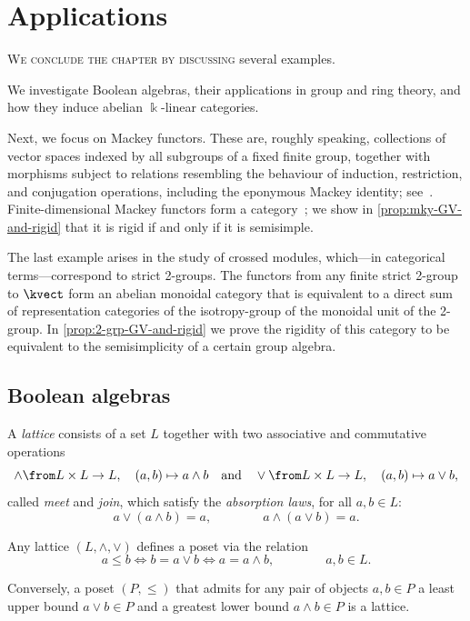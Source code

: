 \section{Applications}\label{sec:mky-2-grps}

\textsc{We conclude the chapter by discussing} several examples.

We investigate Boolean algebras,
their applications in group and ring theory,
and how they induce abelian \(\Bbbk\)\hyp{}linear \GV{} categories.

Next, we focus on Mackey functors.
These are, roughly speaking, collections of vector spaces indexed by all subgroups of a fixed finite group,
together with morphisms subject to relations resembling the behaviour of
induction, restriction, and conjugation operations, including the eponymous Mackey identity;
see~\cite{lindner76:mackey,thevenaz95:mackey}.
Finite\hyp{}dimensional Mackey functors form a \GV{} category~\cite{panchadcharam07:mackey};
we show in \cref{prop:mky-GV-and-rigid} that it is rigid if and only if it is semisimple.

The last example arises in the study of crossed modules,
which—in categorical terms—correspond to strict 2-groups.
The functors from any finite strict 2-group to \(\kvect\) form an abelian monoidal category
that is equivalent to a direct sum of representation categories of the isotropy-group of the monoidal unit of the 2-group.
In \cref{prop:2-grp-GV-and-rigid} we prove the rigidity of this category to be equivalent to the semisimplicity of a certain group algebra.

\subsection{Boolean algebras}\label{sec:boolean-algebras}

\begin{definition}\label{def:lattice}
  A \emph{lattice} consists of a set \(L\) together with two associative and commutative operations
  \[
    \land \from L\times L \to L, \quad (a,b) \mapsto a \land b
    \quad\text{and}\quad
    \lor \from L \times L \to L, \quad (a,b) \mapsto a \lor b,
  \]
  called \emph{meet} and \emph{join}, which satisfy the \emph{absorption laws}, for all \(a, b \in L\):
  \[
    a \lor ( a\land b) = a,\qquad\qquad
    a \land (a \lor b) = a.
  \]
\end{definition}

\begin{remark}
  Any lattice \((L, \land, \lor)\) defines a poset via the relation
  \[
    a \leq b \iff b = a \lor b \iff a = a \land b, \qquad\qquad a, b \in L.
  \]

  Conversely, a poset \((P,\leq)\) that admits for any pair of objects \(a,b \in P\) a least upper bound \(a\lor b \in P\) and a greatest lower bound \(a \land b\in P\) is a lattice.
\end{remark}

